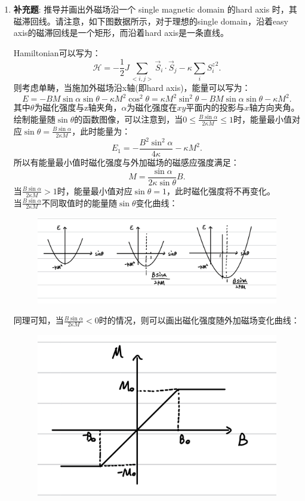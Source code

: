 \documentclass[reqno,a4paper,12pt]{amsart}
\begin{document}
\begin{enumerate}[1.]
\item \textbf{补充题}: 推导并画出外磁场沿一个 single magnetic domain 的hard axis 时，其磁滞回线。请注意，如下图数据所示，对于理想的single domain，沿着easy axis的磁滞回线是一个矩形，而沿着hard axis是一条直线。
\begin{tcolorbox}[breakable, colframe = black, colback = black!5!white]
Hamiltonian可以写为：
\[
	\mathscr{H} = -\frac{1}{2}J\sum_{<i,j>} \vec{S}_i\cdot\vec{S}_j - \kappa \sum_i {S_i^z}^2.
\]
则考虑单畴，当施加外磁场沿x轴(即hard axis)，能量可以写为：
\[
	E = -BM\sin\alpha\sin\theta - \kappa M^2\cos^2\theta = \kappa M^2 \sin^2\theta - BM\sin\alpha\sin\theta - \kappa M^2.
\]
其中$\theta$为磁化强度与z轴夹角，$\alpha$为磁化强度在$xy$平面内的投影与$x$轴方向夹角。绘制能量随$\sin\theta$的函数图像，可以注意到，当$0 \leq \frac{B\sin\alpha}{2\kappa M} \leq 1$时，能量最小值对应$\sin\theta = \frac{B\sin\alpha}{2\kappa M}$，此时能量为：
\[
	E_1 = -\frac{B^2\sin^2\alpha}{4\kappa} - \kappa M^2.
\]
所以有能量最小值时磁化强度与外加磁场的磁感应强度满足：
\[
	M = \frac{\sin\alpha}{2\kappa\sin\theta}B.
\]
当$\frac{B\sin\alpha}{2\kappa M} > 1$时，能量最小值对应$\sin\theta=1$，此时磁化强度将不再变化。 \\
当$\frac{B\sin\alpha}{2\kappa M}$不同取值时的能量随$\sin\theta$变化曲线：
\begin{figure}[H]
	\centering
	\includegraphics[width = 120mm]{sintheta.jpeg}
	\caption{}
\end{figure}
同理可知，当$\frac{B\sin\alpha}{2\kappa M}<0$时的情况，则可以画出磁化强度随外加磁场变化曲线：
\begin{figure}[H]
	\centering
	\includegraphics[width = 120mm]{M-B.jpeg}
	\caption{}
\end{figure}


\end{tcolorbox}

\end{enumerate}
\end{document}
